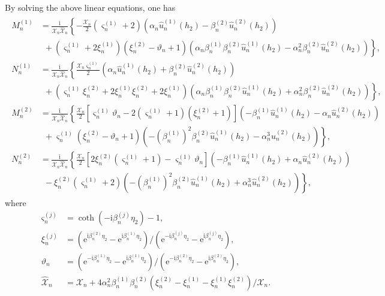 \documentclass[final,3p,times]{elsarticle}
\begin{document}
By solving the above linear equations, one has
\begin{align*}
	\begin{aligned}
		M_n^{(1)} &= \frac{\mathrm{i}}{ \mathcal{X}_{n} \hat{\mathcal{X}}_{n}}\left\{-\frac{\mathcal{X}_{n}}{2}\left(\varsigma_n^{(1)}+2\right)\left(\alpha_n \hat{u}_n^{(1)}(h_2)-\beta_n^{(2)} \hat{u}_n^{(2)}(h_2)\right)\right. \\
		& ~~ + \left.\left(\varsigma_n^{(1)}+2 \xi_n^{(1)}\right)\left(\xi_n^{(2)}-\vartheta_{n}+1\right)\left(\alpha_n \beta_n^{(1)}\beta_n^{(2)} \hat{u}_n^{(1)}(h_2)-\alpha_n^2\beta_n^{(2)} \hat{u}_n^{(2)}(h_2)\right)\right\}, \\
		N_n^{(1)} &= \frac{\mathrm{i}}{ \mathcal{X}_{n} \hat{\mathcal{X}}_{n}}\left\{\frac{\mathcal{X}_{n}\varsigma_n^{(1)} }{2}\left(\alpha_n \hat{u}_n^{(1)}(h_2)+\beta_n^{(2)} \hat{u}_n^{(2)}(h_2)\right)\right. \\
		&~~ +\left.\left(\varsigma_n^{(1)} \xi_n^{(2)}+2\xi_n^{(1)} \xi_n^{(2)}+2\xi_n^{(1)}\right)\left(\alpha_n \beta_n^{(1)} \beta_n^{(2)} \hat{u}_n^{(1)}(h_2)+\alpha_n^2 \beta_n^{(2)} \hat{u}_n^{(2)}(h_2)\right)\right\}, \\
		M_n^{(2)} &= \frac{\mathrm{i}}{ \mathcal{X}_{n} \hat{\mathcal{X}}_{n}}\left\{\frac{\mathcal{X}_{n}}{2}\left[\varsigma_n^{(1)} \vartheta_{n}-2\left(\varsigma_n^{(1)}+1\right)\left(\xi_n^{(2)}+1\right)\right]\left(-\beta_n^{(1)} \hat{u}_n^{(1)}(h_2)-\alpha_n \hat{u}_n^{(2)}(h_2)\right)\right. \\
		&~~+\left.\varsigma_n^{(1)}\left(\xi_n^{(2)}-\vartheta_{n}+1\right)\left(-\left(\beta_n^{(1)}\right)^2 \beta_n^{(2)} \hat{u}_n^{(1)}(h_2)-\alpha_n^3 \hat{u}_n^{(2)}(h_2)\right)\right\}, \\
		N_n^{(2)} &= \frac{\mathrm{i}}{ \mathcal{X}_{n} \hat{\mathcal{X}}_{n}}\left\{\frac{\mathcal{X}_{n}}{2}\left[2 \xi_n^{(2)}\left(\varsigma_n^{(1)}+1\right)-\varsigma_n^{(1)} \vartheta_{n}\right]\left(-\beta_n^{(1)} \hat{u}_n^{(1)}(h_2)+\alpha_n \hat{u}_n^{(2)}(h_2)\right)\right. \\
		&~~ -\left. \xi_n^{(2)}\left(\varsigma_n^{(1)}+2\right)\left(-\left(\beta_n^{(1)}\right)^2 \beta_n^{(2)} \hat{u}_n^{(1)}(h_2)+\alpha_n^3 \hat{u}_n^{(2)}(h_2)\right)\right\},
	\end{aligned}
\end{align*}
where
\begin{align*}
	\varsigma_n^{(j)}  &=\operatorname{coth}\left(-\mathrm{i} \beta_n^{(j)} \eta_2\right)-1, \\ 
	\xi_n^{(j)} & =\left(\mathrm{e}^{\mathrm{i} \beta_n^{(2)} \eta_2}-\mathrm{e}^{\mathrm{i} \beta_n^{(1)} \eta_2}\right) /\left(\mathrm{e}^{-\mathrm{i} \beta_n^{(j)} \eta_2}-\mathrm{e}^{\mathrm{i} \beta_n^{(j)} \eta_2}\right), \\ 
	\vartheta_{n} &=\left(\mathrm{e}^{-\mathrm{i} \beta_n^{(1)}\eta_2} -\mathrm{e}^{\mathrm{i} \beta_n^{(1)} \eta_2}\right) /\left(\mathrm{e}^{-\mathrm{i} \beta_n^{(2)} \eta_2}-\mathrm{e}^{\mathrm{i} \beta_n^{(2)} \eta_2}\right),\\
	\hat{\mathcal{X}}_{n}&=\mathcal{X}_{n}+4\alpha_n^2 \beta_n^{(1)} \beta_n^{(2)}\left(\xi_n^{(2)}-\xi_n^{(1)}-\xi_n^{(1)} \xi_n^{(2)}\right)  / \mathcal{X}_{n}.
\end{align*}
\end{document}
